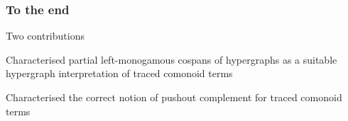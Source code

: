     \begin{frame}
        \frametitle{To the end}

        \center

        \LARGE
        Two contributions

        \await

        \Large
        Characterised \alert{partial left-monogamous} cospans of hypergraphs as
        a suitable hypergraph interpretation of traced comonoid terms

        \vspace{1em}

        \await

        Characterised the correct notion of \alert{pushout complement} for
        traced comonoid terms

    \end{frame}
